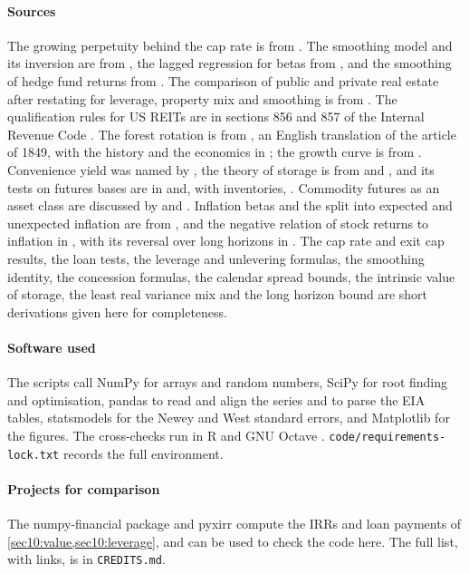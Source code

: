\begin{chapterrefs}
\paragraph{Sources}
The growing perpetuity behind the cap rate is from \textcite{gordon1956}. The smoothing model and its
inversion are from \textcite{geltner1991,geltner1993}, the lagged regression for betas from
\textcite{dimson1979}, and the smoothing of hedge fund returns from \textcite{getmansky2004}. The comparison
of public and private real estate after restating for leverage, property mix and smoothing is from
\textcite{pagliari2005}. The qualification rules for US REITs are in sections 856 and 857 of the Internal
Revenue Code \parencite{usc856}. The forest rotation is from \textcite{faustmann1995}, an English translation
of the article of 1849, with the history and the economics in \textcite{samuelson1976}; the growth curve is
from \textcite{richards1959}. Convenience yield was named by \textcite{kaldor1939}, the theory of storage is
from \textcite{working1949} and \textcite{brennan1958}, and its tests on futures bases are in
\textcite{famafrench1987} and, with inventories, \textcite{gorton2013}. Commodity futures as an asset class are
discussed by \textcite{gorton2006} and \textcite{erb2006}. Inflation betas and the split into expected and
unexpected inflation are from \textcite{fama1977}, and the negative relation of stock returns to inflation
in \textcite{bodie1976}, with its reversal over long horizons in \textcite{boudoukh1993}. The cap rate and exit cap results, the loan tests, the leverage and unlevering
formulas, the smoothing identity, the concession formulas, the calendar spread bounds, the intrinsic value of storage, the least real
variance mix and the long horizon bound are short derivations given here for completeness.

\paragraph{Software used}
The scripts call NumPy \parencite{numpy} for arrays and random numbers, SciPy \parencite{scipy} for root
finding and optimisation, pandas \parencite{pandas} to read and align the series and to parse the EIA
tables, statsmodels \parencite{statsmodels} for the Newey and West standard errors, and Matplotlib
\parencite{matplotlib} for the figures. The cross-checks run in R \parencite{rcore} and GNU Octave
\parencite{octave}. \texttt{code/requirements-lock.txt} records the full environment.

\paragraph{Projects for comparison}
The numpy-financial package \parencite{numpyfinancial} and pyxirr \parencite{pyxirr} compute the IRRs and
loan payments of \cref{sec10:value,sec10:leverage}, and can be used to check the code here. The full list, with
links, is in \texttt{CREDITS.md}.


\end{chapterrefs}
